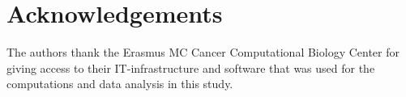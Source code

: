 
\section*{Acknowledgements}
The authors thank the Erasmus MC Cancer Computational Biology Center for giving access to their IT-infrastructure and software that was used for the computations and data analysis in this study.\vspace*{-8pt}